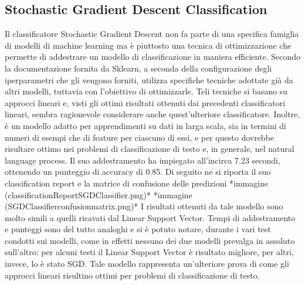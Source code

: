 \documentclass[12pt,oneside]{article}
\begin{document}
   \begin{enumerate}
    \subsection{Stochastic Gradient Descent Classification}
    \begin{justify}
    Il classificatore Stochastic Gradient Descent non fa parte di una specifica famiglia di modelli di machine learning ma è piuttosto una tecnica di ottimizzazione che permette di addestrare un modello di classificazione in maniera efficiente. Secondo la documentazione fornita da Sklearn, a seconda della configurazione degli iperparametri che gli vengono forniti, utilizza specifiche tecniche adottate già da altri modelli, tuttavia con l’obiettivo di ottimizzarle. Teli tecniche si basano su approcci lineari e, visti gli ottimi risultati ottenuti dai precedenti classificatori lineari, sembra ragionevole considerare anche quest’ulteriore classificatore. Inoltre, è un modello adatto per apprendimenti su dati in larga scala, sia in termini di numeri di esempi che di feature per ciascuno di essi, e per questo dovrebbe risultare ottimo nei problemi di classificazione di testo e, in generale, nel natural language process.
    Il suo addestramento ha impiegato all’incirca 7.23 secondi, ottenendo un punteggio di accuracy di 0.85. Di seguito ne si riporta il suo classification report e la matrice di confusione delle predizioni
    *immagine (classificationReportSGDClassifier.png)*
    *immagine (SGDClassifierconfusionmatrix.png)*
    I risultati ottenuti da tale modello sono molto simili a quelli ricavati dal Linear Support Vector. Tempi di addestramento e punteggi sono del tutto analoghi e si è potuto notare, durante i vari test condotti sui modelli, come in effetti nessuno dei due modelli prevalga in assoluto sull’altro: per alcuni testi il Linear Support Vector è risultato migliore, per altri, invece, lo è stato SGD. Tale modello rappresenta un’ulteriore prova di come gli approcci lineari risultino ottimi per problemi di classificazione di testo.
    \end{justify}
    \end{enumerate}
    
\end{document}
